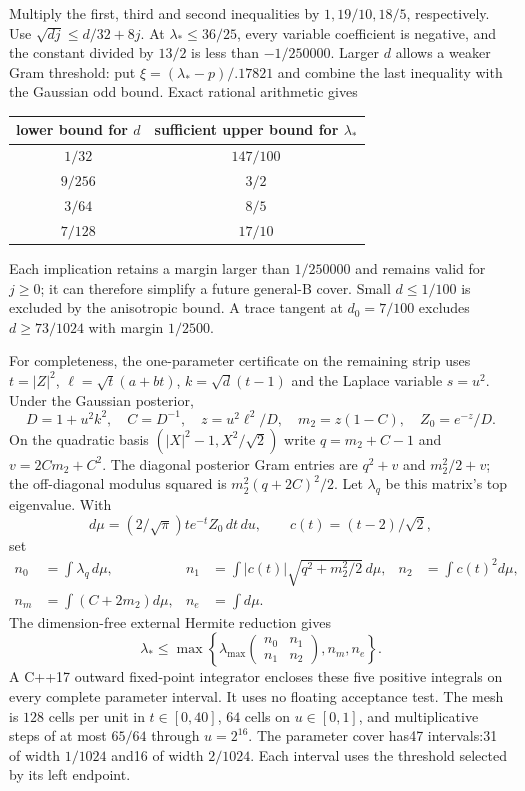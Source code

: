 Multiply the first, third and second inequalities by $1,19/10,18/5$, respectively. Use $\sqrt{dj}\le d/32+8j$. At $\lambda_*\le36/25$, every variable coefficient is negative, and the constant divided by $13/2$ is less than $-1/250000$. Larger $d$ allows a weaker Gram threshold: put $\xi=(\lambda_*-p)/.17821$ and combine the last inequality with the Gaussian odd bound. Exact rational arithmetic gives
\begin{center}
\begin{tabular}{cc}\toprule
lower bound for $d$ & sufficient upper bound for $\lambda_*$\\\midrule
$1/32$ & $147/100$\\
$9/256$ & $3/2$\\
$3/64$ & $8/5$\\
$7/128$ & $17/10$\\\bottomrule
\end{tabular}
\end{center}
Each implication retains a margin larger than $1/250000$ and remains valid for $j\ge0$; it can therefore simplify a future general-B cover. Small $d\le1/100$ is excluded by the anisotropic bound. A trace tangent at $d_0=7/100$ excludes $d\ge73/1024$ with margin $1/2500$.

For completeness, the one-parameter certificate on the remaining strip uses $t=|Z|^2$, $\ell=\sqrt t(a+bt)$, $k=\sqrt d(t-1)$ and the Laplace variable $s=u^2$. Under the Gaussian posterior,
\[
 D=1+u^2k^2,\quad C=D^{-1},\quad z=u^2\ell^2/D,\quad
 m_2=z(1-C),\quad Z_0=e^{-z}/D.
\]
On the quadratic basis $(|X|^2-1,X^2/\sqrt2)$ write $q=m_2+C-1$ and $v=2Cm_2+C^2$. The diagonal posterior Gram entries are $q^2+v$ and $m_2^2/2+v$; the off-diagonal modulus squared is $m_2^2(q+2C)^2/2$. Let $\lambda_q$ be this matrix's top eigenvalue. With
\[
 d\mu=(2/\sqrt\pi)te^{-t}Z_0\,dt\,du,\qquad c(t)=(t-2)/\sqrt2,
\]
set
\begin{align*}
 n_0&=\int\lambda_q\,d\mu,&
 n_1&=\int|c(t)|\sqrt{q^2+m_2^2/2}\,d\mu,&
 n_2&=\int c(t)^2d\mu,\\
 n_m&=\int(C+2m_2)d\mu,&n_e&=\int d\mu.
\end{align*}
The dimension-free external Hermite reduction gives
\[
 \lambda_*\le\max\left\{\lambda_{\max}
 \begin{pmatrix}n_0&n_1\\n_1&n_2\end{pmatrix},n_m,n_e\right\}.
\]
A C++17 outward fixed-point integrator encloses these five positive integrals on every complete parameter interval. It uses no floating acceptance test. The mesh is $128$ cells per unit in $t\in[0,40]$, $64$ cells on $u\in[0,1]$, and multiplicative steps of at most $65/64$ through $u=2^{16}$. The parameter cover has47 intervals:31 of width $1/1024$ and16 of width $2/1024$. Each interval uses the threshold selected by its left endpoint.

